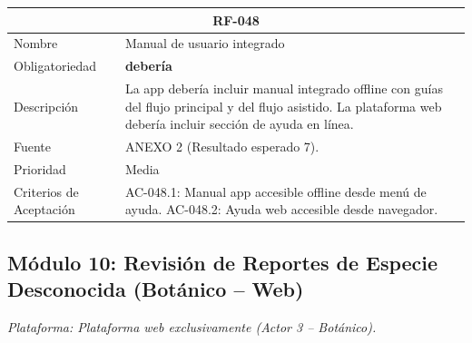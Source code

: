 \documentclass[12pt, a4paper]{article}
\begin{document}
\begin{longtable}{|p{3cm}|p{11.5cm}|}
\hline
\multicolumn{2}{|c|}{\textbf{RF-048}} \\
\hline
Nombre & Manual de usuario integrado \\
\hline
Obligatoriedad & \textbf{deber\'ia} \\
\hline
Descripci\'on & La app deber\'ia incluir manual integrado offline con gu\'ias del flujo principal y del flujo asistido. La plataforma web deber\'ia incluir secci\'on de ayuda en l\'inea. \\
\hline
Fuente & ANEXO 2 (Resultado esperado 7). \\
\hline
Prioridad & Media \\
\hline
Criterios de Aceptaci\'on &
AC-048.1: Manual app accesible offline desde men\'u de ayuda. \newline
AC-048.2: Ayuda web accesible desde navegador. \\
\hline
\end{longtable}

\subsection{M\'odulo 10: Revisi\'on de Reportes de Especie Desconocida (Bot\'anico -- Web)}

\textit{Plataforma: Plataforma web exclusivamente (Actor 3 -- Bot\'anico).}
\end{document}
